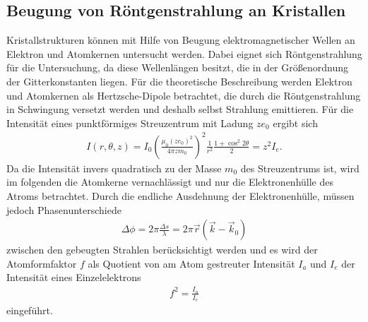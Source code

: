 \FloatBarrier

\subsection{Beugung von Röntgenstrahlung an Kristallen}
\label{subsec:Beugung}
Kristallstrukturen können mit Hilfe von Beugung
elektromagnetischer Wellen an Elektron und Atomkernen untersucht werden.
Dabei eignet sich Röntgenstrahlung
für die Untersuchung, da diese
Wellenlängen besitzt, die in der
Größenordnung der Gitterkonstanten liegen.
Für die theoretische Beschreibung werden Elektron
und Atomkernen
als Hertzsche-Dipole betrachtet, die durch die
Röntgenstrahlung in Schwingung versetzt
werden und deshalb selbst
Strahlung emittieren.
Für die Intensität eines punktförmiges Streuzentrum mit
Ladung $ze_0$ ergibt sich
\begin{align}
I(r,\theta,z) = I_0\left(\frac{\mu_0 (ze_0)^2}{4\pi zm_0}\right)^2\frac{1}{r^2}\frac{1+\cos^2 2\theta}{2}=z^2 I_e \label{6}.
\end{align}
Da die Intensität invers
quadratisch zu der Masse $m_0$ des Streuzentrums ist,
wird im folgenden die Atomkerne vernachlässigt und
nur die Elektronenhülle des Atroms betrachtet.
Durch die endliche Ausdehnung der Elektronenhülle,
müssen jedoch Phasenunterschiede
\begin{align*}
\Delta\phi=2\pi\frac{\Delta s}{\lambda}= 2\pi\vec{r}\left(\vec{k}-\vec{k}_0\right)
\end{align*}
zwischen den gebeugten
Strahlen berücksichtigt werden und es wird
der Atomformfaktor $f$ als Quotient
von am Atom gestreuter Intensität $I_a$ und $I_e$ der
Intensität eines Einzelelektrons
\begin{align}
f^2=\frac{I_a}{I_e}
\end{align}
eingeführt.

